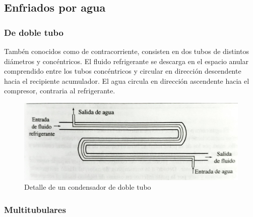 \subsection{Enfriados por agua}

\subsubsection{De doble tubo}

Tamb\'en conocidos como de contracorriente, consisten en dos tubos de distintos di\'ametros y conc\'entricos. El fluido refrigerante se descarga en el espacio anular comprendido entre los tubos conc\'entricos y circular en direcci\'on descendente hacia el recipiente acumulador. El agua circula en direcci\'on ascendente hacia el compresor, contraria al refrigerante.
\begin{figure}[h]
    \centering
    \includegraphics[width=.7\linewidth]{figuras/condensadores/condensador de doble tubo.jpg}
    \caption{Detalle de un condensador de doble tubo}
    \label{fig:Detalle de un condensador de doble tubo}
\end{figure}

\subsubsection{Multitubulares}

